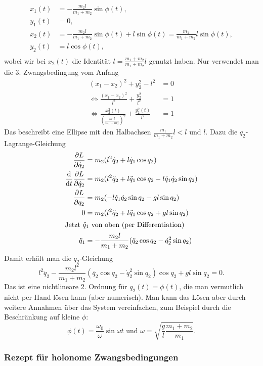 \begin{beispiel*}
	\begin{align*}
		x_1(t) &= - \frac{m_2 l}{m_1 + m_2} \sin \phi(t), \\
		y_1(t) &= 0, \\
		x_2(t) &= - \frac{m_2 l}{m_1 + m_2} \sin \phi(t) + l \sin \phi(t) = \frac{m_1}{m_1 + m_2} l \sin \phi(t), \\
		y_2(t) &= l \cos \phi(t), \\
	\end{align*}
	wobei wir bei $x_2(t)$ die Identität $l = \frac{m_1 + m_2}{m_1 + m_2} l$ genutzt haben. Nur verwendet man die 3. Zwangsbedingung vom Anfang
	\begin{align*}
	(x_1 - x_2)^2 + y_2^2 - l^2 &= 0\\
	\Leftrightarrow \frac{(x_1 - x_2)^2}{l^2} + \frac{y_2^2}{l^2} &= 1\\ 
	\Leftrightarrow \frac{x_2^2(t)}{(\frac{m_1 l}{m_1 + m_2})^2} + \frac{y_2^2(t)}{l^2} &= 1
	\end{align*}
	Das beschreibt eine Ellipse mit den Halbachsen $\frac{m_1}{m_1 + m_2}l < l \text{~und~} l$.
	Dazu die $q_2$-Lagrange-Gleichung
	\begin{align*}
	\frac{\partial L}{\partial \dot{q}_2} &= m_2 (l^2 \dot{q}_2 + l \dot{q}_1 \cos q_2)\\
	\frac{\mathrm d}{\mathrm d t} \frac{\partial L}{\partial \dot{q}_2} &= m_2 (l^2 \ddot{q}_2 + l \ddot{q}_1 \cos q_2 - l \dot{q}_1 \dot{q}_2 \sin q_2)\\
	\frac{\partial L}{\partial q_2} &= m_2 (- l \dot{q}_1 \dot{q}_2 \sin q_2 - g l \sin q_2)\\
	0 &= m_2 (l^2 \ddot{q}_2 + l \ddot{q}_1 \cos q_2 + g l \sin q_2)\\
	\intertext{Jetzt $\ddot{q}_1$ von oben (per Differentiation)}
	\ddot{q}_1 &= - \frac{m_2 l}{m_1 + m_2} (\ddot{q}_2 \cos q_2 - \dot{q}_2^2 \sin q_2)
	\end{align*}
	Damit erhält man die $q_2$-Gleichung
	\[
		l^2 \ddot{q}_2 - \frac{m_2 l^2}{m_1 + m_2}(\ddot{q_2} \cos q_2 - \dot{q}_2^2 \sin q_2) \cos q_2 + g l \sin q_2 = 0
		\text{.}
	\]
	Das ist eine nichtlineare \Dgl{} 2. Ordnung für $q_2(t) = \phi(t)$, die man vermutlich nicht per Hand lösen kann (aber numerisch). 
	Man kann das Lösen aber durch weitere Annahmen über das System vereinfachen, zum Beispiel durch die Beschränkung auf kleine $\phi$:
	\[
		\phi(t) = \frac{\omega_0}{\omega} \sin \omega t \text{~und~} \omega = \sqrt{\frac{g}{l} \frac{m_1 + m_2}{m_1}}
		\text{.}
	\]
\end{beispiel*}


\subsubsection{Rezept für holonome Zwangsbedingungen}

